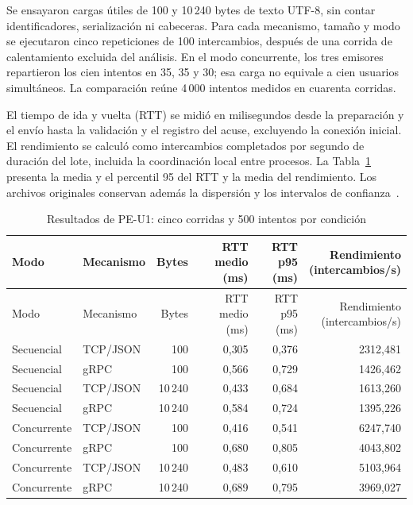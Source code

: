 Se ensayaron cargas útiles de 100 y 10\,240 bytes de texto UTF-8, sin contar identificadores, serialización ni cabeceras. Para cada mecanismo, tamaño y modo se ejecutaron cinco repeticiones de 100 intercambios, después de una corrida de calentamiento excluida del análisis. En el modo concurrente, los tres emisores repartieron los cien intentos en 35, 35 y 30; esa carga no equivale a cien usuarios simultáneos. La comparación reúne 4\,000 intentos medidos en cuarenta corridas.

El tiempo de ida y vuelta (RTT) se midió en milisegundos desde la preparación y el envío hasta la validación y el registro del acuse, excluyendo la conexión inicial. El rendimiento se calculó como intercambios completados por segundo de duración del lote, incluida la coordinación local entre procesos. La Tabla~\ref{tab:peu1-comunicacion} presenta la media y el percentil 95 del RTT y la media del rendimiento. Los archivos originales conservan además la dispersión y los intervalos de confianza~\cite{peu1-2026-resultados}.

\begingroup
\small
\begin{longtable}{@{}llrrrr@{}}
\caption{Resultados de PE-U1: cinco corridas y 500 intentos por condición}
\label{tab:peu1-comunicacion}\\
\toprule
Modo & Mecanismo & Bytes & \shortstack{RTT medio\\(ms)} & \shortstack{RTT p95\\(ms)} & \shortstack{Rendimiento\\(intercambios/s)}\\
\midrule
\endfirsthead
\toprule
Modo & Mecanismo & Bytes & \shortstack{RTT medio\\(ms)} & \shortstack{RTT p95\\(ms)} & \shortstack{Rendimiento\\(intercambios/s)}\\
\midrule
\endhead
Secuencial & TCP/JSON & 100 & 0{,}305 & 0{,}376 & 2312{,}481 \\
Secuencial & gRPC & 100 & 0{,}566 & 0{,}729 & 1426{,}462 \\
Secuencial & TCP/JSON & 10\,240 & 0{,}433 & 0{,}684 & 1613{,}260 \\
Secuencial & gRPC & 10\,240 & 0{,}584 & 0{,}724 & 1395{,}226 \\
Concurrente & TCP/JSON & 100 & 0{,}416 & 0{,}541 & 6247{,}740 \\
Concurrente & gRPC & 100 & 0{,}680 & 0{,}805 & 4043{,}802 \\
Concurrente & TCP/JSON & 10\,240 & 0{,}483 & 0{,}610 & 5103{,}964 \\
Concurrente & gRPC & 10\,240 & 0{,}689 & 0{,}795 & 3969{,}027 \\
\bottomrule
\end{longtable}
\endgroup

